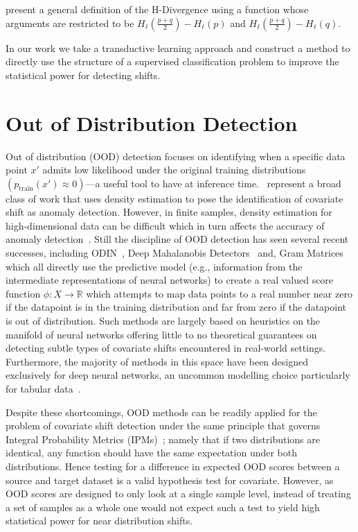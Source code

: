 \citeauthor{zhao2022comparing} present a general definition of the H-Divergence using a function whose arguments are restricted to be $H_\ell\left( \frac{p+q}{2} \right) - H_\ell(p)$ and $H_\ell\left( \frac{p+q}{2} \right) - H_\ell(q)$.


In our work we take a transductive learning approach and construct a method to directly use the structure of a supervised classification problem to improve the statistical power for detecting shifts.


\section{Out of Distribution Detection}\label{sec:out-of-distribution-detection}
Out of distribution (OOD) detection focuses on identifying when a specific data point $x'$ admits low likelihood under the original training distributions
$(p_{\text{train}}(x') \approx 0)$---a useful tool to have at inference time.~\cite{densityratio, densityofstates} represent a broad class of work that uses density estimation
to pose the identification of covariate shift as anomaly detection.
However, in finite samples, density estimation for high-dimensional data can be difficult which in turn affects the accuracy of anomaly detection~\citep{failuresofgen}.
Still the discipline of OOD detection has seen several recent successes, including ODIN~\citep{ODIN}, Deep Mahalanobis Detectors~\citep{mahalano}
and, Gram Matrices~\citep{grammat} which all directly use the predictive model (e.g., information from the intermediate representations of neural networks) to create a real valued score function $\phi: X\to \mathbb{R}$
which attempts to map data points to a real number near zero if the datapoint is in the training distribution and far from zero if the datapoint is out of distribution.
Such methods are largely based on heuristics on the manifold of neural networks offering little to no theoretical guarantees on detecting subtle types of covariate shifts encountered in real-world settings.
Furthermore, the majority of methods in this space have been designed exclusively for deep neural networks, an uncommon modelling choice particularly for tabular data~\citep{tabdatasurvey}.

Despite these shortcomings, OOD methods can be readily applied for the problem of covariate shift detection under the same principle that governs Integral Probability Metrics (IPMs)~\citep{IPMS}; namely that if two
distributions are identical, any function should have the same expectation under both distributions.
Hence testing for a difference in expected OOD scores between a source and target dataset is a valid hypothesis test for covariate.
However, as OOD scores are designed to only look at a single sample level, instead of treating a set of samples as a whole one would not expect such a test to yield high statistical power for near distribution shifts.


